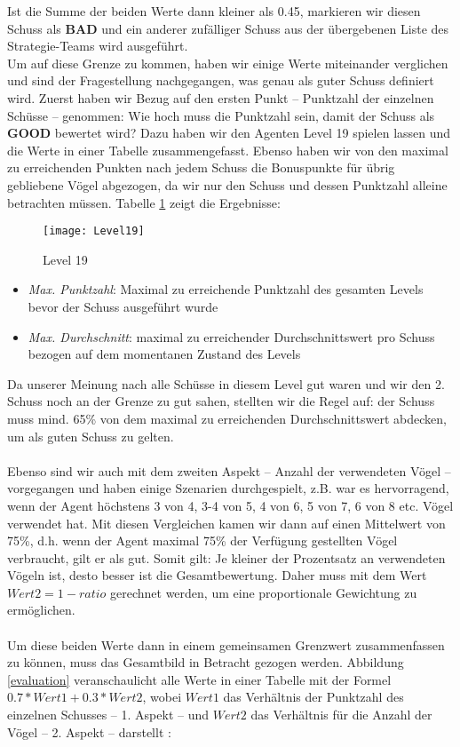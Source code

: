 Ist die Summe der beiden Werte dann kleiner als 0.45, markieren wir diesen Schuss als \textbf{BAD} und ein anderer zufälliger Schuss aus der übergebenen Liste des Strategie-Teams wird ausgeführt. \\
Um auf diese Grenze zu kommen, haben wir einige Werte miteinander verglichen und sind der Fragestellung nachgegangen, was genau als guter Schuss definiert wird. Zuerst haben wir Bezug auf den ersten Punkt -- Punktzahl der einzelnen Schüsse -- genommen: Wie hoch muss die Punktzahl sein, damit der Schuss als \textbf{GOOD} bewertet wird? Dazu haben wir den Agenten Level 19 spielen lassen und die Werte in einer Tabelle zusammengefasst. Ebenso haben wir von den maximal zu erreichenden Punkten nach jedem Schuss die Bonuspunkte für übrig gebliebene Vögel abgezogen, da wir nur den Schuss und dessen Punktzahl alleine betrachten müssen. Tabelle \ref{lvl19} zeigt die Ergebnisse:

\begin{figure}[H]
  \centering
    \texttt{[image: Level19]}
   \caption{Level 19}
   \label{lvl19}
\end{figure}

\begin{itemize}
\item \textit{Max. Punktzahl}: Maximal zu erreichende Punktzahl des gesamten Levels bevor der Schuss ausgeführt wurde
\item \textit{Max. Durchschnitt}: maximal zu erreichender Durchschnittswert pro Schuss bezogen auf dem momentanen Zustand des Levels 
\end{itemize}

Da unserer Meinung nach alle Schüsse in diesem Level gut waren und wir den 2. Schuss noch an der Grenze zu gut sahen, stellten wir die Regel auf: der Schuss muss mind. 65\% von dem maximal zu erreichenden Durchschnittswert abdecken, um als guten Schuss zu gelten. \\
\\
Ebenso sind wir auch mit dem zweiten Aspekt -- Anzahl der verwendeten Vögel -- vorgegangen und haben einige Szenarien durchgespielt, z.B. war es hervorragend, wenn der Agent höchstens 3 von 4, 3-4 von 5, 4 von 6, 5 von 7, 6 von 8 etc. Vögel verwendet hat. Mit diesen Vergleichen kamen wir dann auf einen Mittelwert von 75\%, d.h. wenn der Agent maximal 75\% der Verfügung gestellten Vögel verbraucht, gilt er als gut. Somit gilt: Je kleiner der Prozentsatz an verwendeten Vögeln ist, desto besser ist die Gesamtbewertung. Daher muss mit dem Wert $Wert2 = 1 - ratio$ gerechnet werden, um eine proportionale Gewichtung zu ermöglichen. \\
\\
Um diese beiden Werte dann in einem gemeinsamen Grenzwert zusammenfassen zu können, muss das Gesamtbild in Betracht gezogen werden. Abbildung \ref{evaluation} veranschaulicht alle Werte in einer Tabelle mit der Formel $0.7 * Wert1 + 0.3 * Wert2$, wobei $Wert1$ das Verhältnis der Punktzahl des einzelnen Schusses -- 1. Aspekt -- und $Wert2$ das Verhältnis für die Anzahl der Vögel -- 2. Aspekt -- darstellt :

